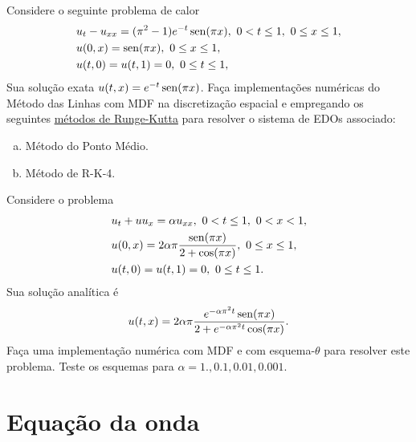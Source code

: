\begin{exer}
  Considere o seguinte problema de calor
  \begin{subequations}
    \begin{align}
      &u_t - u_{xx} = (\pi^2 - 1)e^{-t}\operatorname{sen}(\pi x), ~0 < t \leq 1, ~0\leq x \leq 1,\\
      &u(0,x) = \operatorname{sen}(\pi x), ~0 \leq x \leq 1,\\
      &u(t,0) = u(t,1) = 0, ~ 0 \leq t \leq 1,
    \end{align}
  \end{subequations}
  Sua solução exata $u(t,x) = e^{-t}\operatorname{sen}(\pi x)$. Faça implementações numéricas do Método das Linhas com MDF na discretização espacial e empregando os seguintes \href{https://notaspedrok.com.br/notas/MatematicaNumericaII/cap_pvi_sec_rk.html}{métodos de Runge-Kutta} para resolver o sistema de EDOs associado:
  \begin{enumerate}[a)]
  \item Método do Ponto Médio.
  \item Método de R-K-4.
  \end{enumerate}
\end{exer}

\begin{exer}
  Considere o problema
  \begin{subequations}
    \begin{align}
      &u_t + uu_x = \alpha u_{xx}, ~0<t\leq 1, ~0<x<1,\\
      &u(0,x) = 2\alpha \pi\frac{\operatorname{sen}(\pi x)}{2 + \cos(\pi x)}, ~0\leq x\leq 1,\\
      &u(t,0) = u(t,1) = 0, ~0\leq t\leq 1.
    \end{align}
  \end{subequations}
  Sua solução analítica é \cite{Wood2006a}
  \begin{equation}
    u(t,x) = 2\alpha\pi\frac{e^{-\alpha\pi^2 t}\operatorname{sen}(\pi x)}{2 + e^{-\alpha\pi^2 t}\cos(\pi x)}.
  \end{equation}
  Faça uma implementação numérica com MDF e com esquema-$\theta$ para resolver este problema. Teste os esquemas para $\alpha = 1., 0.1, 0.01, 0.001$.
\end{exer}


\section{Equação da onda}\label{cap_edp_sec_onda}

